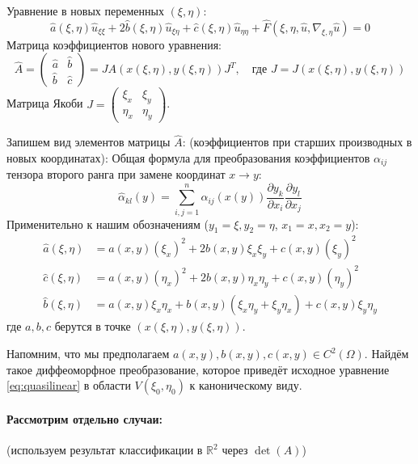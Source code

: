 \documentclass[12pt, a4paper]{article}
\begin{document}
Уравнение в новых переменных $(\xi, \eta)$:
\[
\hat{a}(\xi,\eta) \hat{u}_{\xi\xi} + 2\hat{b}(\xi,\eta) \hat{u}_{\xi\eta} + \hat{c}(\xi,\eta) \hat{u}_{\eta\eta} + \hat{F}(\xi, \eta, \hat{u}, \nabla_{\xi,\eta} \hat{u}) = 0
\]
Матрица коэффициентов нового уравнения:
\[
\hat{A} = \begin{pmatrix} \hat{a} & \hat{b} \\ \hat{b} & \hat{c} \end{pmatrix}
 = J A(x(\xi,\eta), y(\xi,\eta)) J^T, \quad \text{где } J = J(x(\xi,\eta), y(\xi,\eta))
\]
Матрица Якоби $J = \begin{pmatrix} \xi_x & \xi_y \\ \eta_x & \eta_y \end{pmatrix}$.

Запишем вид элементов матрицы $\hat{A}$: 
(коэффициентов при старших производных в новых координатах):
Общая формула для преобразования коэффициентов $\alpha_{ij}$ тензора второго ранга при замене координат $x \to y$:
\[ \hat{\alpha}_{kl}(y) = \sum_{i,j=1}^n \alpha_{ij}(x(y)) \frac{\partial y_k}{\partial x_i} \frac{\partial y_l}{\partial x_j} \]
Применительно к нашим обозначениям ($y_1=\xi, y_2=\eta$, $x_1=x, x_2=y$):
\begin{align*}
\hat{a}(\xi,\eta) &= a(x,y) (\xi_x)^2 + 2b(x,y) \xi_x \xi_y + c(x,y) (\xi_y)^2 \\
\hat{c}(\xi,\eta) &= a(x,y) (\eta_x)^2 + 2b(x,y) \eta_x \eta_y + c(x,y) (\eta_y)^2 \\
\hat{b}(\xi,\eta) &= a(x,y) \xi_x \eta_x + b(x,y) (\xi_x \eta_y + \xi_y \eta_x) + c(x,y) \xi_y \eta_y
\end{align*}
где $a, b, c$ берутся в точке $(x(\xi,\eta), y(\xi,\eta))$.

Напомним, что мы предполагаем $a(x,y), b(x,y), c(x,y) \in C^2(\Omega)$. Найдём такое диффеоморфное преобразование, которое приведёт исходное уравнение \eqref{eq:quasilinear} в области $V(\xi_0, \eta_0)$ к каноническому виду.

\paragraph{Рассмотрим отдельно случаи:} (используем результат классификации в $\mathbb{R}^2$ через $\det(A)$)
\end{document}
